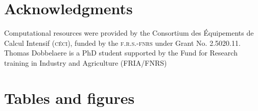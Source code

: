 \documentclass[utf8]{frontiersSCNS}
\begin{document}
\section*{Acknowledgments}
Computational resources were provided by the Consortium des \'Equipements de Calcul Intensif (\textsc{c\'eci}), funded by the \textsc{f.r.s.-fnrs} under Grant No. 2.5020.11. Thomas Dobbelaere is a PhD student supported by the Fund for Research training in Industry and Agriculture (\textsc{FRIA}/\textsc{FNRS})


 



\section*{Tables and figures}
\end{document}
